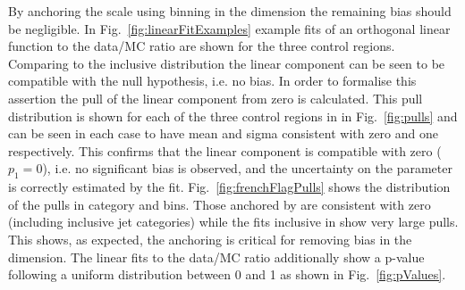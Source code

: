 By anchoring the scale using binning in the \scalht dimension the remaining
bias should be negligible. In Fig.~\ref{fig:linearFitExamples} 
example fits of an orthogonal linear function to the data/MC ratio 
are shown for the three control regions. Comparing to the inclusive distribution 
the linear component can be seen to be compatible with the null hypothesis, 
i.e. no bias. In order to formalise this assertion 
the pull of the linear component from zero is calculated.
This pull distribution is shown for each of the three control regions in
in Fig.~\ref{fig:pulls} and can be seen in each case to have mean and sigma
consistent with zero and one respectively. This confirms that the linear component 
is compatible with zero ($p_1 = 0$), i.e. no significant bias is observed, 
and the uncertainty on the parameter is correctly estimated by the fit.
Fig.~\ref{fig:frenchFlagPulls} shows the distribution of the pulls 
in category and \scalht bins. Those anchored by \scalht are consistent
with zero (including inclusive jet categories) while the fits inclusive in \scalht
show very large pulls. This shows, as expected, the \scalht anchoring
is critical for removing bias in the \mht dimension. The linear fits to the
data/MC ratio additionally show a p-value following 
a uniform distribution between 0 and 1 as shown in Fig.~\ref{fig:pValues}.


